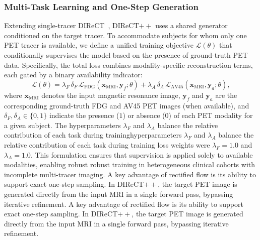 \documentclass{article}
\providecommand{\DIFaddtex}[1]{{\protect\color{blue} \sf #1}} %
\providecommand{\DIFdeltex}[1]{{\protect\color{red} \ifmmode #1\else\scriptsize #1\fi}} %
\providecommand{\DIFaddbegin}{} %
\providecommand{\DIFaddend}{} %
\providecommand{\DIFdelbegin}{} %
\providecommand{\DIFdelend}{} %
\providecommand{\DIFadd}[1]{\texorpdfstring{\DIFaddtex{#1}}{#1}} %
\providecommand{\DIFdel}[1]{\texorpdfstring{\DIFdeltex{#1}}{}} %
\newcommand{\DIFscaledelfig}{0.5}
\newlength{\DIFdelgraphicswidth} %
\newlength{\DIFdelgraphicsheight} %
\newcommand{\DIFaddincludegraphics}[2][]{{\color{blue}\fbox{\DIFOincludegraphics[#1]{#2}}}} %
\newcommand{\DIFdelincludegraphics}[2][]{%
\sbox{\DIFdelgraphicsbox}{\DIFOincludegraphics[#1]{#2}}%
\settoboxwidth{\DIFdelgraphicswidth}{\DIFdelgraphicsbox} %
\settoboxtotalheight{\DIFdelgraphicsheight}{\DIFdelgraphicsbox} %
\scalebox{\DIFscaledelfig}{%
\parbox[b]{\DIFdelgraphicswidth}{\usebox{\DIFdelgraphicsbox}\\[-\baselineskip] \rule{\DIFdelgraphicswidth}{0em}}\llap{\resizebox{\DIFdelgraphicswidth}{\DIFdelgraphicsheight}{%
\setlength{\unitlength}{\DIFdelgraphicswidth}%
\begin{picture}(1,1)%
\thicklines\linethickness{2pt} %
{\color[rgb]{1,0,0}\put(0,0){\framebox(1,1){}}}%
{\color[rgb]{1,0,0}\put(0,0){\line( 1,1){1}}}%
{\color[rgb]{1,0,0}\put(0,1){\line(1,-1){1}}}%
\end{picture}%
}\hspace*{3pt}}} %
} %
\DeclareRobustCommand{\DIFaddbegin}{\DIFOaddbegin \let\includegraphics\DIFaddincludegraphics} %
\DeclareRobustCommand{\DIFaddend}{\DIFOaddend \let\includegraphics\DIFOincludegraphics} %
\DeclareRobustCommand{\DIFdelbegin}{\DIFOdelbegin \let\includegraphics\DIFdelincludegraphics} %
\DeclareRobustCommand{\DIFdelend}{\DIFOaddend \let\includegraphics\DIFOincludegraphics} %
\begin{document}
\subsubsection{Multi-Task Learning and One-Step Generation}
\DIFaddbegin \DIFadd{Extending single-tracer DIReCT~\cite{liu2025direct}, DIReCT$++$ uses a shared generator conditioned on the target tracer. }\DIFaddend To accommodate subjects for whom only one PET tracer is available, we define a unified training objective $\mathcal{L}(\theta)$ that conditionally supervises the model based on the presence of ground-truth PET data. Specifically, the total loss combines modality-specific reconstruction terms, each gated by a binary availability indicator:
\begin{equation}
\mathcal{L}(\theta) = \lambda_F \, \delta_F \, \mathcal{L}_{\text{FDG}}(\mathbf{x}_{\text{MRI}}, \mathbf{y}_f; \theta) + \lambda_A \, \delta_A \, \mathcal{L}_{\text{AV45}}(\mathbf{x}_{\text{MRI}}, \mathbf{y}_a; \theta),
\label{eq:multitask_loss}
\end{equation}
where $\mathbf{x}_{\text{MRI}}$ denotes the input magnetic resonance image, $\mathbf{y}_f$ and $\mathbf{y}_a$ are the corresponding ground-truth FDG and AV45 PET images (when available), and $\delta_F, \delta_A \in \{0,1\}$ indicate the presence ($1$) or absence ($0$) of each PET modality for a given subject. The \DIFdelbegin \DIFdel{hyperparameters $\lambda_F$ and $\lambda_A$ balance the relative contribution of each task during training}\DIFdelend \DIFaddbegin \DIFadd{loss weights were $\lambda_F=1.0$ and $\lambda_A=1.0$}\DIFaddend . This formulation ensures that supervision is applied solely to available modalities, enabling \DIFdelbegin \DIFdel{robust }\DIFdelend training in heterogeneous clinical cohorts with incomplete multi-tracer imaging.
\DIFdelbegin \DIFdel{A key advantage of rectified flow is its ability to support exact one-step sampling. In DIReCT$++$, the target PET image is generated directly from the input MRI in a single forward pass, bypassing iterative refinement. %
}%
\end{document}
